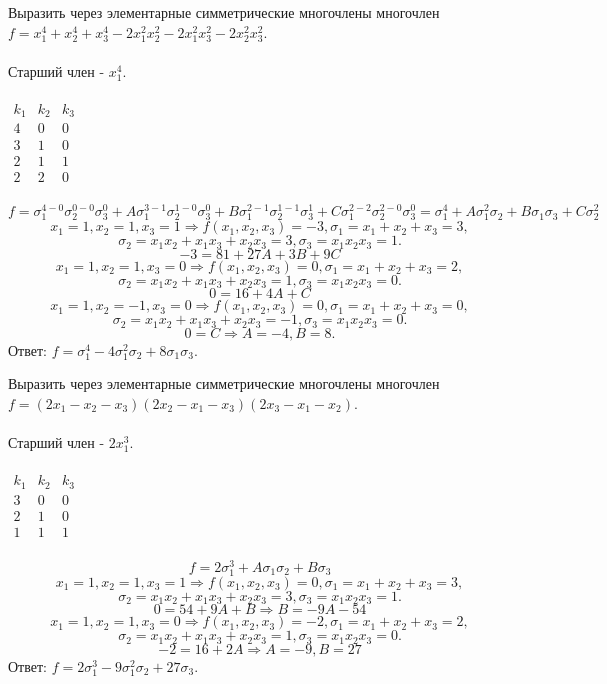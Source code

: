 \documentclass[12pt]{article}
\begin{document}
\begin{examp}
Выразить через элементарные симметрические многочлены многочлен $f = x_1^4 + x_2^4 + x_3^4 - 2x_1^2x_2^2 - 2x_1^2x_3^2 - 2x_2^2x_3^2$. \\ \\
\indent Старший член - $x_1^4$. \\ \\
$\begin{array}{c|c|c}
  k_1 & k_2 & k_3 \\ \hline
  4 & 0 & 0 \\
  3 & 1 & 0 \\
  2 & 1 & 1 \\
  2 & 2 & 0
\end{array}$ \\ \\
$$f = \sigma_1^{4-0}\sigma_2^{0-0}\sigma_3^{0} + A\sigma_1^{3-1}\sigma_2^{1-0}\sigma_3^{0} + B\sigma_1^{2-1}\sigma_2^{1-1}\sigma_3^{1} + C\sigma_1^{2-2}\sigma_2^{2-0}\sigma_3^{0} = \sigma_1^{4} + A\sigma_1^{2}\sigma_2 + B\sigma_1\sigma_3 + C\sigma_2^{2}$$
$$x_1 = 1, x_2 = 1, x_3 = 1 \Rightarrow f(x_1,x_2,x_3) = -3, \sigma_1 = x_1 + x_2 + x_3 = 3,$$
$$\sigma_2 = x_1x_2 + x_1x_3 + x_2x_3 = 3, \sigma_3 = x_1x_2x_3 = 1.$$
$$-3 = 81 + 27A + 3B + 9C$$
$$x_1 = 1, x_2 = 1, x_3 = 0 \Rightarrow f(x_1,x_2,x_3) = 0, \sigma_1 = x_1 + x_2 + x_3 = 2,$$
$$\sigma_2 = x_1x_2 + x_1x_3 + x_2x_3 = 1, \sigma_3 = x_1x_2x_3 = 0.$$
$$0 = 16 + 4A + C$$
$$x_1 = 1, x_2 = -1, x_3 = 0 \Rightarrow f(x_1,x_2,x_3) = 0, \sigma_1 = x_1 + x_2 + x_3 = 0,$$
$$\sigma_2 = x_1x_2 + x_1x_3 + x_2x_3 = -1, \sigma_3 = x_1x_2x_3 = 0.$$
$$0 = C \Rightarrow A = -4, B = 8.$$
Ответ: $f = \sigma_1^4 - 4\sigma_1^2\sigma_2 + 8\sigma_1\sigma_3$.
\end{examp}
\begin{examp}
Выразить через элементарные симметрические многочлены многочлен $f = (2x_1 - x_2 - x_3)(2x_2 - x_1 - x_3)(2x_3 - x_1 - x_2)$. \\ \\
\indent Старший член - $2x_1^3$. \\ \\
$\begin{array}{c|c|c}
  k_1 & k_2 & k_3 \\ \hline
  3 & 0 & 0 \\
  2 & 1 & 0 \\
  1 & 1 & 1
\end{array}$ \\ \\
$$f = 2\sigma_1^3 + A\sigma_1\sigma_2 + B\sigma_3$$
$$x_1 = 1, x_2 = 1, x_3 = 1 \Rightarrow f(x_1,x_2,x_3) = 0, \sigma_1 = x_1 + x_2 + x_3 = 3,$$
$$\sigma_2 = x_1x_2 + x_1x_3 + x_2x_3 = 3, \sigma_3 = x_1x_2x_3 = 1.$$
$$0 = 54 + 9A + B \Rightarrow B = -9A - 54$$
$$x_1 = 1, x_2 = 1, x_3 = 0 \Rightarrow f(x_1,x_2,x_3) = -2, \sigma_1 = x_1 + x_2 + x_3 = 2,$$
$$\sigma_2 = x_1x_2 + x_1x_3 + x_2x_3 = 1, \sigma_3 = x_1x_2x_3 = 0.$$
$$-2 = 16 + 2A \Rightarrow A = -9, B = 27$$
Ответ: $f = 2\sigma_1^3  - 9\sigma_1^2\sigma_2 + 27\sigma_3$.
\end{examp}
\end{document}
